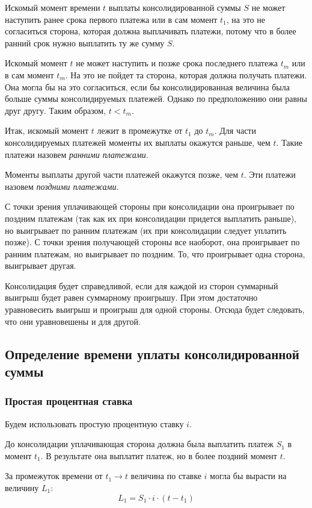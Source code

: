 \documentclass[aps,%
12pt,%
final,%
oneside,
onecolumn,%
musixtex, %
superscriptaddress,%
centertags]{article} %
\theoremstyle{plain}
\theoremstyle{definition}
\theoremstyle{remark}
\begin{document}
Искомый момент времени $t$ выплаты консолидированной суммы $S$ не может наступить ранее срока первого платежа или в сам момент $t_1$, на это не согласиться сторона, которая должна выплачивать платежи, потому что в более ранний срок нужно выплатить ту же сумму $S$.

Искомый момент $t$ не может наступить и позже срока последнего платежа $t_m$ или в сам момент $t_m$. На это не пойдет та сторона, которая должна получать платежи. Она могла бы на это согласиться, если бы консолидированная величина была больше суммы консолидируемых платежей. Однако по предположению они равны друг другу. Таким образом, $ t < t_m $.

Итак, искомый момент $t$ лежит в промежутке от $t_1$ до $t_m$. Для части консолидируемых платежей моменты их выплаты окажутся раньше, чем $t$. Такие платежи назовем \textit{ранними платежами}. 

Моменты выплаты другой части платежей окажутся позже, чем $t$. Эти платежи назовем \textit{поздними платежами}.

С точки зрения уплачивающей стороны при консолидации она проигрывает по поздним платежам (так как их при консолидации придется выплатить раньше), но выигрывает по ранним платежам (их при консолидации следует уплатить позже). С точки зрения получающей стороны все наоборот, она проигрывает по ранним платежам, но выигрывает по поздним. То, что проигрывает одна сторона, выигрывает другая.

Консолидация будет справедливой, если для каждой из сторон суммарный выигрыш будет равен суммарному проигрышу. При этом достаточно уравновесить выигрыш и проигрыш для одной стороны. Отсюда будет следовать, что они уравновешены и для другой.

\subsection{Определение времени уплаты консолидированной суммы}

\subsubsection{Простая процентная ставка}

Будем использовать простую процентную ставку $i$.

До консолидации уплачивающая сторона должна была выплатить платеж $S_1$ в момент $t_1$. В результате она выплатит платеж, но в более поздний момент $t$.

За промежуток времени от $t_1 \to t$ величина по ставке $i$ могла бы вырасти на величину $L_1$:
$$L_1 = S_1 \cdot i \cdot (t-t_1)$$
\end{document}
